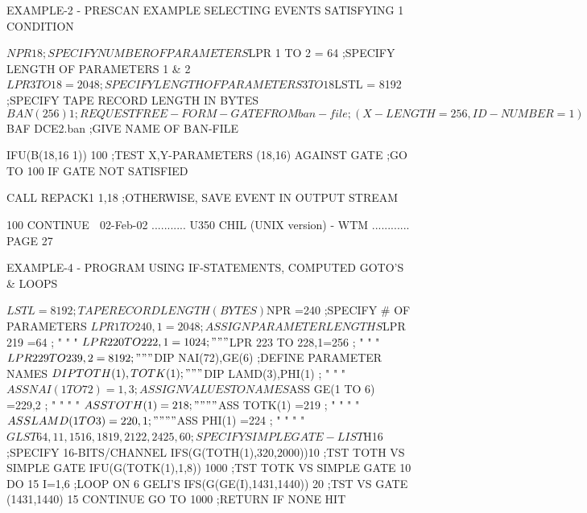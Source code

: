  
 
   EXAMPLE-2 - PRESCAN EXAMPLE SELECTING EVENTS SATISFYING 1 CONDITION
 
   $NPR 18                    ;SPECIFY NUMBER OF PARAMETERS
   $LPR 1 TO  2 = 64          ;SPECIFY LENGTH OF PARAMETERS 1 & 2
   $LPR 3 TO 18 = 2048        ;SPECIFY LENGTH OF PARAMETERS 3 TO 18
   $LSTL        = 8192        ;SPECIFY TAPE RECORD LENGTH IN BYTES
   $BAN (256) 1               ;REQUEST FREE-FORM-GATE FROM ban-file
                              ;(X-LENGTH = 256, ID-NUMBER = 1)
   $BAF DCE2.ban              ;GIVE NAME OF BAN-FILE
 
         IFU(B(18,16 1)) 100  ;TEST X,Y-PARAMETERS (18,16) AGAINST GATE
                              ;GO TO 100 IF GATE NOT SATISFIED
 
         CALL REPACK1 1,18    ;OTHERWISE, SAVE EVENT IN OUTPUT STREAM
 
     100 CONTINUE
    
   02-Feb-02 ........... U350  CHIL (UNIX version) - WTM ............ PAGE  27
 
   EXAMPLE-4  - PROGRAM USING IF-STATEMENTS, COMPUTED GOTO'S & LOOPS
 
   $LSTL=8192                               ;TAPE RECORD LENGTH (BYTES)
   $NPR =240                                ;SPECIFY # OF PARAMETERS
   $LPR   1 TO 240,1=2048                   ;ASSIGN PARAMETER LENGTHS
   $LPR 219         =64                     ;   "      "        "
   $LPR 220 TO 222,1=1024                   ;   "      "        "
   $LPR 223 TO 228,1=256                    ;   "      "        "
   $LPR 229 TO 239,2=8192                   ;   "      "        "
   $DIP NAI(72),GE(6)                       ;DEFINE PARAMETER NAMES
   $DIP TOTH(1),TOTK(1)                     ;   "      "        "
   $DIP LAMD(3),PHI(1)                      ;   "      "        "
   $ASS NAI(1 TO 72)=1,3                    ;ASSIGN VALUES TO NAMES
   $ASS GE(1 TO 6)  =229,2                  ;   "      "    "   "
   $ASS TOTH(1)     =218                    ;   "      "    "   "
   $ASS TOTK(1)     =219                    ;   "      "    "   "
   $ASS LAMD(1 TO 3)=220,1                  ;   "      "    "   "
   $ASS PHI(1)      =224                    ;   "      "    "   "
   $GLST  64,1 1,15 16,18 19,21 22,24 25,60 ;SPECIFY SIMPLE GATE-LIST
   $H16                                     ;SPECIFY 16-BITS/CHANNEL
         IFS(G(TOTH(1),320,2000))10         ;TST TOTH VS SIMPLE GATE
         IFU(G(TOTK(1),1,8))     1000       ;TST TOTK VS SIMPLE GATE
      10 DO 15 I=1,6                        ;LOOP ON 6 GELI'S
         IFS(G(GE(I),1431,1440)) 20         ;TST VS GATE (1431,1440)
      15 CONTINUE
         GO TO 1000                         ;RETURN IF NONE HIT
 

